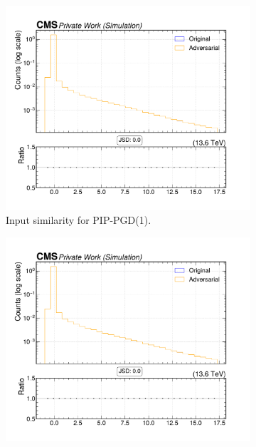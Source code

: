 \begin{figure}[htbp]
  \centering
  \begin{subfigure}[t]{0.32\textwidth}
    \includegraphics[width=\linewidth]{media/output/features/compare/combined_it_1/cmp_cpf_arr_Cpfcan_BtagPf_trackSip3dVal.pdf}
    \caption*{Input similarity for PIP-PGD(1).}
  \end{subfigure}\hfill
  \begin{subfigure}[t]{0.32\textwidth}
    \includegraphics[width=\linewidth]{media/output/features/compare/combined_it_2/cmp_cpf_arr_Cpfcan_BtagPf_trackSip3dVal.pdf}

\end{subfigure}
\end{figure}
